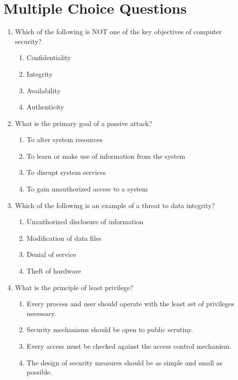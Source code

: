 \documentclass{article}
\begin{document}
\section{Multiple Choice Questions}
\begin{enumerate}
    \item Which of the following is NOT one of the key objectives of computer security?
    \begin{enumerate}
        \item Confidentiality
        \item Integrity
        \item Availability
        \item Authenticity
    \end{enumerate}
    
    \item What is the primary goal of a passive attack?
    \begin{enumerate}
        \item To alter system resources
        \item To learn or make use of information from the system
        \item To disrupt system services
        \item To gain unauthorized access to a system
    \end{enumerate}
    
    \item Which of the following is an example of a threat to data integrity?
    \begin{enumerate}
        \item Unauthorized disclosure of information
        \item Modification of data files
        \item Denial of service
        \item Theft of hardware
    \end{enumerate}
    
    \item What is the principle of least privilege?
    \begin{enumerate}
        \item Every process and user should operate with the least set of privileges necessary.
        \item Security mechanisms should be open to public scrutiny.
        \item Every access must be checked against the access control mechanism.
        \item The design of security measures should be as simple and small as possible.
    \end{enumerate}
    

\end{enumerate}
\end{document}
